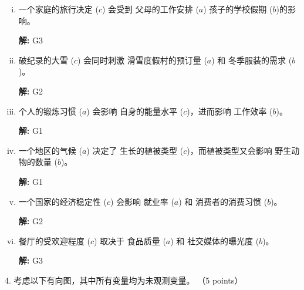 \documentclass[8pt]{article}
\begin{document}
\begin{enumerate}[(i)]
        \item 
        一个家庭的旅行决定 (\(c\)) 会受到 父母的工作安排 (\(a\)) 孩子的学校假期 (\(b\))的影响。

        \textbf{\large 解:} G3
        \vspace{1em}
        
        \item 
        破纪录的大雪 (\(c\))  会同时刺激 滑雪度假村的预订量 (\(a\)) 和 冬季服装的需求 (\(b\))。

        \textbf{\large 解:} G2
        \vspace{1em}

        \item 
        个人的锻炼习惯 (\(a\)) 会影响 自身的能量水平 (\(c\))，进而影响 工作效率 (\(b\))。

        \textbf{\large 解:} G1
        \vspace{1em}

        \item 
        一个地区的气候 (\(a\)) 决定了 生长的植被类型 (\(c\))，而植被类型又会影响 野生动物的数量 (\(b\))。

        \textbf{\large 解:} G1
        \vspace{1em}

        \item 
        一个国家的经济稳定性 (\(c\)) 会影响 就业率 (\(a\)) 和 消费者的消费习惯 (\(b\))。

        \textbf{\large 解:} G2
        \vspace{1em}
        
        \item 
        餐厅的受欢迎程度 (\(c\)) 取决于 食品质量 (\(a\)) 和 社交媒体的曝光度 (\(b\))。
        
        \textbf{\large 解:} G3
        \vspace{1em}

    \end{enumerate}




4. 考虑以下有向图，其中所有变量均为未观测变量。 （5 points）

    \begin{figure}[h]
        \centering
    \end{figure}
\end{document}
